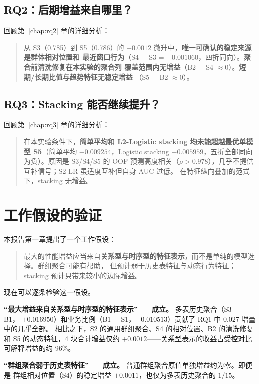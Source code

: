 \documentclass[11pt,UTF8,fontset=windows]{ctexrep}
\begin{document}
\subsection{RQ2：后期增益来自哪里？}

回顾第~\ref{chap:rq2} 章的详细分析：

\begin{quote}
从 S3（0.785）到 S5（0.786）的 $+0.0012$ 微升中，\textbf{唯一可确认的稳定来源是群体相对位置和
最近窗口行为}（S4 $-$ S3 = $+0.001060$，四折同向）。\textbf{聚合前清洗修复在本实验的聚合列
覆盖范围内无增益}（B2 $-$ S4 $\approx 0$）。\textbf{短期/长期比值与趋势特征无稳定增益}
（S5 $-$ B2 $\approx 0$）。
\end{quote}

\subsection{RQ3：Stacking 能否继续提升？}

回顾第~\ref{chap:rq3} 章的详细分析：

\begin{quote}
在本实验条件下，\textbf{简单平均和 L2-Logistic stacking 均未能超越最优单模型 S5}（简单平均
$-0.009254$，Logistic stacking $-0.005959$，五折全部同向为负）。原因是 S3/S4/S5 的 OOF
预测高度相关（$\rho > 0.978$），几乎不提供互补信号；S2-LR 虽适度互补但自身 AUC 过低。
在特征纵向叠加的范式下，stacking 无增益。
\end{quote}

\section{工作假设的验证}

本报告第一章提出了一个工作假设：

\begin{quote}
最大的性能增益应当来自\textbf{关系型与时序型的特征表示}，而不是单纯的模型选择。群组聚合可能有帮助，
但预计弱于历史表特征与动态行为特征；stacking 预计只带来较小的边际增益。
\end{quote}

现在可以逐条检验这一假设。

\textbf{“最大增益来自关系型与时序型的特征表示”}——\textbf{成立。} 多表历史聚合（S3 $-$ B1，
$+0.016950$）和业务比例（B1 $-$ S1，$+0.010513$）贡献了 RQ1 中 0.027 增量中的几乎全部。
相比之下，S2 的通用群组聚合、S4 的相对位置、B2 的清洗修复和 S5 的动态特征，4 块合计增益仅约
$+0.0012$——关系型表示的收益占受控对比可解释增益的约 96\%。

\textbf{“群组聚合弱于历史表特征”}——\textbf{成立。} 普通群组聚合原值单独增益约为零。即便是
群组相对位置（S4）的稳定增益 $+0.0011$，也仅为多表历史聚合的 $1/15$。
\end{document}
